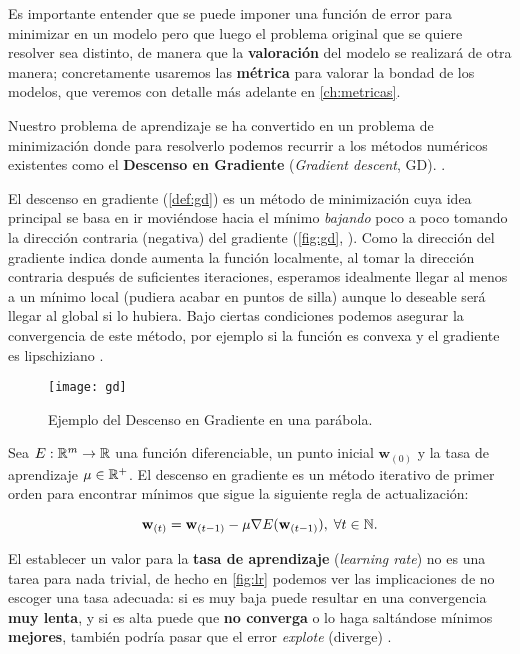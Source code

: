 Es importante entender que se puede imponer una función de error para minimizar en un modelo pero que luego el problema original que se quiere resolver sea distinto, de manera que la \textbf{valoración} del modelo se realizará de otra manera; concretamente usaremos las \textbf{métrica} para valorar la bondad de los modelos, que veremos con detalle más adelante en \autoref{ch:metricas}.

Nuestro problema de aprendizaje se ha convertido en un problema de minimización donde para resolverlo podemos recurrir a los métodos numéricos existentes como el \textbf{Descenso en Gradiente} (\emph{Gradient descent}, GD). \cite{curry1944method}.

El descenso en gradiente (\autoref{def:gd}) es un método de minimización cuya idea principal se basa en ir moviéndose hacia el mínimo \emph{bajando} poco a poco tomando la dirección contraria (negativa) del gradiente (\autoref{fig:gd}, \cite{molala2019sd}). Como la dirección del gradiente indica donde aumenta la función localmente, al tomar la dirección contraria después de suficientes iteraciones, esperamos idealmente llegar al menos a un mínimo local (pudiera acabar en puntos de silla) aunque lo deseable será llegar al global si lo hubiera. Bajo ciertas condiciones podemos asegurar la convergencia de este método, por ejemplo si la función es convexa y el gradiente es lipschiziano \cite{shalev2014understanding}.

\begin{figure}[htpb]
  \centering
  \texttt{[image: gd]}
  \caption{Ejemplo del Descenso en Gradiente en una parábola.}
  \label{fig:gd}
\end{figure}

\begin{definicion}
  Sea $E : \mathbb{R}^m \to \mathbb{R}$ una función diferenciable, un punto inicial $\textbf{w}_{(0)}$ y la tasa de aprendizaje $\mu \in \mathbb{R}^+$. El descenso en gradiente es un método iterativo de primer orden para encontrar mínimos que sigue la siguiente regla de actualización:

  $$\textbf{w}_{(t)} = \textbf{w}_{(t-1)} - \mu \nabla E(\textbf{w}_{(t-1)}), \; \forall t \in \mathbb{N}.$$
  \label{def:gd}
\end{definicion}

El establecer un valor para la \textbf{tasa de aprendizaje} (\emph{learning rate}) no es una tarea para nada trivial, de hecho en \autoref{fig:lr} podemos ver las implicaciones de no escoger una tasa adecuada: si es muy baja puede resultar en una convergencia \textbf{muy lenta}, y si es alta puede que \textbf{no converga} o lo haga saltándose mínimos \textbf{mejores}, también podría pasar que el error \emph{explote} (diverge) \cite{ruder2016overview}.

